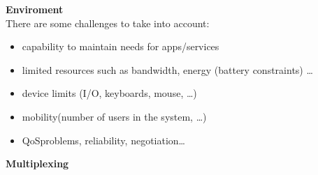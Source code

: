 \vspace{1em}
\textbf{Enviroment}\\[0.2cm]
There are some challenges to take into account:
\begin{itemize}
    \item capability to maintain needs for apps/services
    \item limited resources such as bandwidth, energy (battery constraints) \dots
    \item device limits (I/O, keyboards, mouse, \dots)
    \item mobility(number of users in the system, \dots)
    \item QoS\footQoS problems, reliability, negotiation\dots
\end{itemize}
\vspace{1em}
\textbf{Multiplexing}
